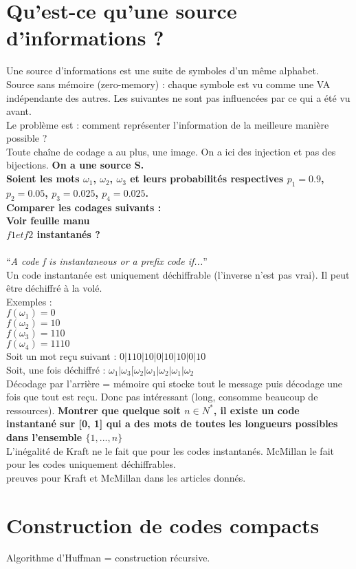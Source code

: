 \section{Qu'est-ce qu'une source d'informations ?}
Une source d'informations est une suite de symboles d'un même alphabet.\\
Source sans mémoire (zero-memory) : chaque symbole est vu comme une VA indépendante des autres. Les suivantes ne sont pas influencées par ce qui a été vu avant.\\
Le problème est : comment représenter l'information de la meilleure manière possible ?\\
Toute chaîne de codage a au plus, une image. On a ici des injection et pas des bijections.
\textbf{On a une source S.\\Soient les mots $\omega_1$, $\omega_2$, $\omega_3$ et leurs probabilités respectives $p_1=0.9$, $p_2=0.05$, $p_3=0.025$, $p_4=0.025$.\\Comparer les codages suivants :\\Voir feuille manu\\$f1 et f2$ instantanés ?}\\~\\
\enquote{\textit{A code f is instantaneous or a prefix code if...}}\\
Un code instantanée est uniquement déchiffrable (l'inverse n'est pas vrai). Il peut être déchiffré à la volé.\\
Exemples : \\
$f(\omega_1)=0$\\
$f(\omega_2)=10$\\
$f(\omega_3)=110$\\
$f(\omega_4)=1110$\\
Soit un mot reçu suivant : $0|110|10|0|10|10|0|10$\\
Soit, une fois déchiffré : $\omega_1|\omega_3[\omega_2|\omega_1|\omega_2|\omega_1|\omega_2$\\
\textbf{}
Décodage par l'arrière = mémoire qui stocke tout le message puis décodage une fois que tout est reçu. Donc pas intéressant (long, consomme beaucoup de ressources).
\textbf{Montrer que quelque soit $n \in N^*$, il existe un code instantané sur [0, 1] qui a des mots de toutes les longueurs possibles dans l'ensemble $\{1,..., n\}$}\\
L'inégalité de Kraft ne le fait que pour les codes instantanés. McMillan le fait pour les codes uniquement déchiffrables.\\
preuves pour Kraft et McMillan dans les articles donnés.\\

\section{Construction de codes compacts}
Algorithme d'Huffman = construction récursive.